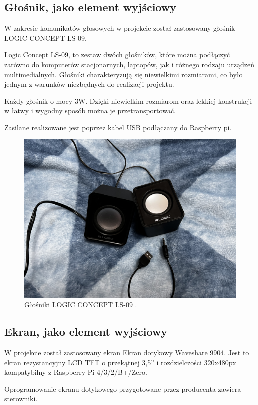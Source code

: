 \documentclass[a4paper,12pt,reqno]{article}
\begin{document}
\subsection{Głośnik, jako element wyjściowy}

W zakresie komunikatów głosowych w projekcie został zastosowany głośnik LOGIC CONCEPT LS-09.

Logic Concept LS-09, to zestaw dwóch głośników, które można podłączyć zarówno do komputerów stacjonarnych, laptopów, jak i różnego rodzaju urządzeń multimedialnych. Głośniki charakteryzują się niewielkimi rozmiarami, co było jednym z warunków niezbędnych do realizacji projektu.

Każdy głośnik o mocy 3W. Dzięki niewielkim rozmiarom oraz lekkiej konstrukcji w łatwy i wygodny sposób można je przetransportować.

Zasilane realizowane jest poprzez kabel USB podłączany do Raspberry pi.

\begin{figure}[H]%
\centering
\includegraphics[width=0.8\columnwidth]{imgs/glosnik.jpg}
\caption{Głośniki LOGIC CONCEPT LS-09 \cite{img_me}.  \label{glosnik}}
\quad
\end{figure}

\subsection{Ekran, jako element wyjściowy}

W projekcie został zastosowany ekran Ekran dotykowy Waveshare 9904. Jest to ekran rezystancyjny LCD TFT o przekątnej 3,5'' i rozdzielczości 320x480px kompatybilny z Raspberry Pi 4/3/2/B+/Zero.

Oprogramowanie ekranu dotykowego przygotowane przez producenta zawiera sterowniki.
\end{document}
